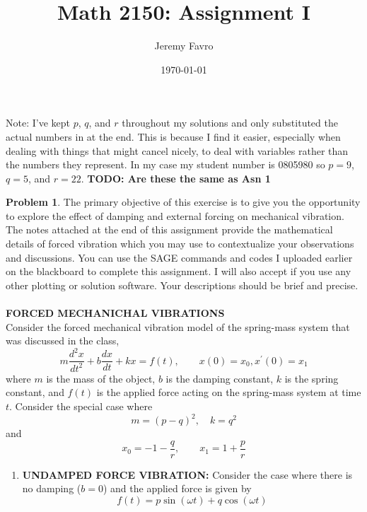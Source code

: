 \documentclass[10pt]{article}
\title{Math 2150: Assignment I}
\author{Jeremy Favro}
\date{\today}
\theoremstyle{definition}
\newtheorem{problem}{Problem}
\begin{document}
\maketitle
\noindent Note: I've kept $p$, $q$, and $r$ throughout my solutions and only substituted the actual numbers in at the end. This is because I find it easier,
especially when dealing with things that might cancel nicely, to deal with variables rather than the numbers they represent. In my case my
student number is 0805980 so $p=9$, $q=5$, and $r=22$. \textbf{TODO: Are these the same as Asn 1}
\\
\begin{problem}
The primary objective of this exercise is to give you the opportunity to explore the effect
of damping and external forcing on mechanical vibration. The notes attached at the end of
this assignment provide the mathematical details of forced vibration which you may use to
contextualize your observations and discussions. You can use the SAGE commands and codes
I uploaded earlier on the blackboard to complete this assignment. I will also accept if you
use any other plotting or solution software. Your descriptions should be brief and precise. \\\\
\textbf{FORCED MECHANICHAL VIBRATIONS}
\\
Consider the forced mechanical vibration model of the spring-mass system that was discussed in the class,
\begin{equation}
  m\frac{d^2x}{dt^2}+b\frac{dx}{dt}+kx=f(t), \qquad x(0)=x_0, x^\prime(0)=x_1
\end{equation}
where $m$ is the mass of the object, $b$ is the damping constant, $k$ is the spring constant, and $f(t)$ is the applied
force acting on the spring-mass system at time $t$. Consider the special case where
\begin{equation}
  m=(p-q)^2,\quad k=q^2
\end{equation}
and
\begin{equation*}
  x_0=-1-\frac{q}{r}, \qquad x_1=1+\frac{p}{r}
\end{equation*}
\begin{enumerate}[label=(\alph*)]
  \item \textbf{UNDAMPED FORCE VIBRATION:} Consider the case where there is no damping ($b = 0$) and the applied force is given by
        \begin{equation}
          f(t)=p\sin\left(\omega t\right)+q\cos\left(\omega t\right)
        \end{equation}

\end{enumerate}
\end{problem}
\end{document}
